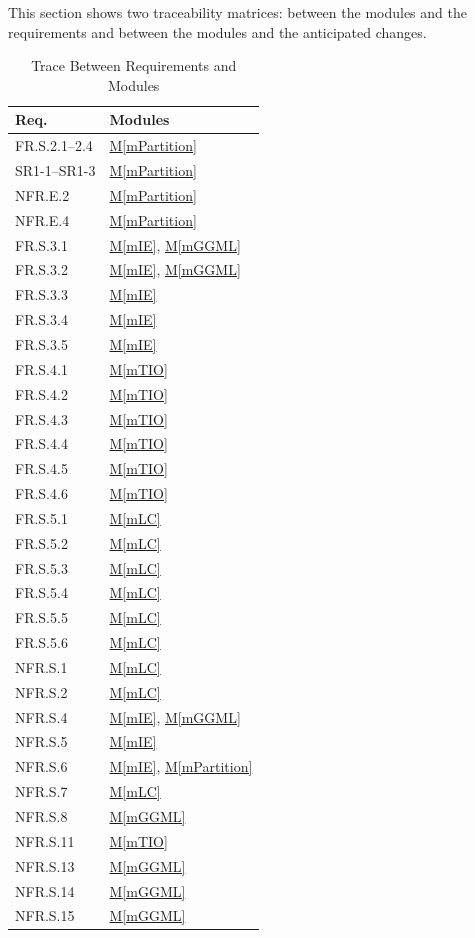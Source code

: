 \documentclass[12pt, titlepage]{article}
\newcommand{\mref}[1]{\hyperref[sec:#1]{M\ref*{#1}}}
\begin{document}
This section shows two traceability matrices: between the modules and the
requirements and between the modules and the anticipated changes.

\begin{table}[H]
\centering
\begin{tabular}{p{} p{}}
\toprule
\textbf{Req.} & \textbf{Modules}\\
\midrule
FR.S.2.1--2.4 & \mref{mPartition}\\
SR1-1--SR1-3 & \mref{mPartition}\\
NFR.E.2 & \mref{mPartition}\\
NFR.E.4 & \mref{mPartition}\\
FR.S.3.1 & \mref{mIE}, \mref{mGGML}\\
FR.S.3.2 & \mref{mIE}, \mref{mGGML}\\
FR.S.3.3 & \mref{mIE}\\
FR.S.3.4 & \mref{mIE}\\
FR.S.3.5 & \mref{mIE}\\
FR.S.4.1 & \mref{mTIO}\\
FR.S.4.2 & \mref{mTIO}\\
FR.S.4.3 & \mref{mTIO}\\
FR.S.4.4 & \mref{mTIO}\\
FR.S.4.5 & \mref{mTIO}\\
FR.S.4.6 & \mref{mTIO}\\
FR.S.5.1 & \mref{mLC}\\
FR.S.5.2 & \mref{mLC}\\
FR.S.5.3 & \mref{mLC}\\
FR.S.5.4 & \mref{mLC}\\
FR.S.5.5 & \mref{mLC}\\
FR.S.5.6 & \mref{mLC}\\
NFR.S.1 & \mref{mLC}\\
NFR.S.2 & \mref{mLC}\\
NFR.S.4 & \mref{mIE}, \mref{mGGML}\\
NFR.S.5 & \mref{mIE}\\
NFR.S.6 & \mref{mIE}, \mref{mPartition}\\
NFR.S.7 & \mref{mLC}\\
NFR.S.8 & \mref{mGGML}\\
NFR.S.11 & \mref{mTIO}\\
NFR.S.13 & \mref{mGGML}\\
NFR.S.14 & \mref{mGGML}\\
NFR.S.15 & \mref{mGGML}\\
\bottomrule
\end{tabular}
\caption{Trace Between Requirements and Modules}
\label{TblRT}
\end{table}
\end{document}
